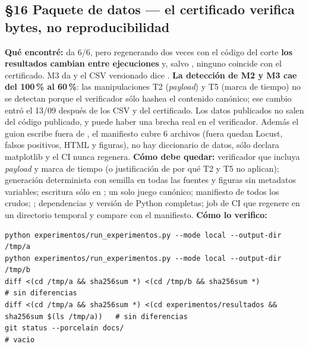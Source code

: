 \subsection*{\S16 Paquete de datos --- el certificado verifica bytes, no reproducibilidad}
\textbf{Qu\'e encontr\'e:}  da 6/6, pero regenerando dos veces con el c\'odigo del corte \textbf{los resultados cambian entre ejecuciones} y, salvo , ninguno coincide con el certificado. M3 da  y el CSV versionado dice . \textbf{La detecci\'on de M2 y M3 cae del 100\,\% al 60\,\%}: las manipulaciones T2 (\emph{payload}) y T5 (marca de tiempo) no se detectan porque el verificador s\'olo hashea el contenido can\'onico; ese cambio entr\'o el 13/09 despu\'es de los CSV y del certificado. Los datos publicados no salen del c\'odigo publicado, y puede haber una brecha real en el verificador. Adem\'as el guion escribe fuera de , el manifiesto cubre 6 archivos (fuera quedan Locust, falsos positivos, HTML y figuras), no hay diccionario de datos,  s\'olo declara matplotlib y el CI nunca regenera. \textbf{C\'omo debe quedar:} verificador que incluya \emph{payload} y marca de tiempo (o justificaci\'on de por qu\'e T2 y T5 no aplican); generaci\'on determinista con semilla en todas las fuentes y figuras sin metadatos variables; escritura s\'olo en ; un solo juego can\'onico; manifiesto de todos los crudos; ; dependencias y versi\'on de Python completas; job de CI que regenere en un directorio temporal y compare con el manifiesto. \textbf{C\'omo lo verifico:}\begin{verbatim}
python experimentos/run_experimentos.py --mode local --output-dir /tmp/a
python experimentos/run_experimentos.py --mode local --output-dir /tmp/b
diff <(cd /tmp/a && sha256sum *) <(cd /tmp/b && sha256sum *)          # sin diferencias
diff <(cd /tmp/a && sha256sum *) <(cd experimentos/resultados && sha256sum $(ls /tmp/a))   # sin diferencias
git status --porcelain docs/                                           # vacio
\end{verbatim}

